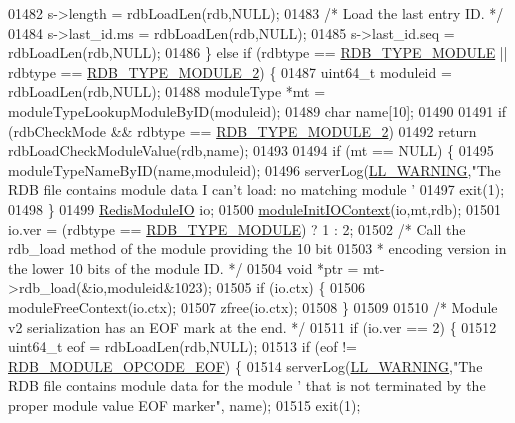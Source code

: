 \begin{DoxyCode}
{{{{{{{{{{{{{{{{{{{{{{{{01482         s->length = rdbLoadLen(rdb,NULL);
01483         \textcolor{comment}{/* Load the last entry ID. */}
01484         s->last\_id.ms = rdbLoadLen(rdb,NULL);
01485         s->last\_id.seq = rdbLoadLen(rdb,NULL);
01486     \} \textcolor{keywordflow}{else} \textcolor{keywordflow}{if} (rdbtype == \hyperlink{rdb_8h_a2aaf3a047c290427775427aeef4399e4}{RDB\_TYPE\_MODULE} || rdbtype == 
      \hyperlink{rdb_8h_a9a996d2f95870c7165faaa316a6f8931}{RDB\_TYPE\_MODULE\_2}) \{
01487         uint64\_t moduleid = rdbLoadLen(rdb,NULL);
01488         moduleType *mt = moduleTypeLookupModuleByID(moduleid);
01489         \textcolor{keywordtype}{char} name[10];
01490 
01491         \textcolor{keywordflow}{if} (rdbCheckMode && rdbtype == \hyperlink{rdb_8h_a9a996d2f95870c7165faaa316a6f8931}{RDB\_TYPE\_MODULE\_2})
01492             \textcolor{keywordflow}{return} rdbLoadCheckModuleValue(rdb,name);
01493 
01494         \textcolor{keywordflow}{if} (mt == NULL) \{
01495             moduleTypeNameByID(name,moduleid);
01496             serverLog(\hyperlink{server_8h_a31229b9334bba7d6be2a72970967a14b}{LL\_WARNING},\textcolor{stringliteral}{"The RDB file contains module data I can't load: no
       matching module '%
01497             exit(1);
01498         \}
01499         \hyperlink{structRedisModuleIO}{RedisModuleIO} io;
01500         \hyperlink{server_8h_abe94415e34ee463788c4c863dc029908}{moduleInitIOContext}(io,mt,rdb);
01501         io.ver = (rdbtype == \hyperlink{rdb_8h_a2aaf3a047c290427775427aeef4399e4}{RDB\_TYPE\_MODULE}) ? 1 : 2;
01502         \textcolor{comment}{/* Call the rdb\_load method of the module providing the 10 bit}
01503 \textcolor{comment}{         * encoding version in the lower 10 bits of the module ID. */}
01504         \textcolor{keywordtype}{void} *ptr = mt->rdb\_load(&io,moduleid&1023);
01505         \textcolor{keywordflow}{if} (io.ctx) \{
01506             moduleFreeContext(io.ctx);
01507             zfree(io.ctx);
01508         \}
01509 
01510         \textcolor{comment}{/* Module v2 serialization has an EOF mark at the end. */}
01511         \textcolor{keywordflow}{if} (io.ver == 2) \{
01512             uint64\_t eof = rdbLoadLen(rdb,NULL);
01513             \textcolor{keywordflow}{if} (eof != \hyperlink{rdb_8h_a905d414d752c18bdea4cf67b498fee52}{RDB\_MODULE\_OPCODE\_EOF}) \{
01514                 serverLog(\hyperlink{server_8h_a31229b9334bba7d6be2a72970967a14b}{LL\_WARNING},\textcolor{stringliteral}{"The RDB file contains module data for the module '%
       that is not terminated by the proper module value EOF marker"}, name);
01515                 exit(1);
}}}}}}}}}}}}}}}}}}}}}}}}}
\end{DoxyCode}
